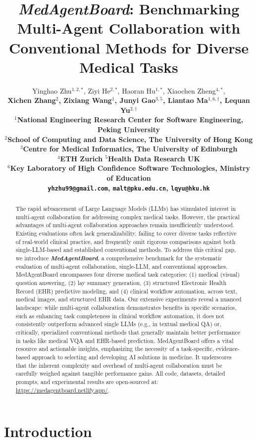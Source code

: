 \documentclass{article}
\title{\Large \textit{MedAgentBoard}: Benchmarking Multi-Agent Collaboration with Conventional Methods for Diverse Medical Tasks}
\author{
  Yinghao Zhu$^{1,2,\ast}$, Ziyi He$^{2,\ast}$, Haoran Hu$^{1,\ast}$, Xiaochen Zheng$^{4,\ast}$,\\
  \bf{Xichen Zhang$^{2}$, Zixiang Wang$^{1}$, Junyi Gao$^{3,5}$, Liantao Ma$^{1,6,\dagger}$, Lequan Yu$^{2, \dagger}$}\\
  $^{1}$National Engineering Research Center for Software Engineering, Peking University\\
  $^{2}$School of Computing and Data Science, The University of Hong Kong\\
  $^{3}$Centre for Medical Informatics, The University of Edinburgh\\
  $^{4}$ETH Zurich \quad $^{5}$Health Data Research UK\\
  $^{6}$Key Laboratory of High Confidence Software Technologies, Ministry of Education\\
  \texttt{yhzhu99@gmail.com}, \texttt{malt@pku.edu.cn}, \texttt{lqyu@hku.hk}
}
\begin{document}
\maketitle

\setcounter{footnote}{0}
\renewcommand{\thefootnote}{\fnsymbol{footnote}}

\begin{abstract}
The rapid advancement of Large Language Models (LLMs) has stimulated interest in multi-agent collaboration for addressing complex medical tasks. However, the practical advantages of multi-agent collaboration approaches remain insufficiently understood. Existing evaluations often lack generalizability, failing to cover diverse tasks reflective of real-world clinical practice, and frequently omit rigorous comparisons against both single-LLM-based and established conventional methods. To address this critical gap, we introduce \textit{\textbf{MedAgentBoard}}, a comprehensive benchmark for the systematic evaluation of multi-agent collaboration, single-LLM, and conventional approaches. MedAgentBoard encompasses four diverse medical task categories: (1) medical (visual) question answering, (2) lay summary generation, (3) structured Electronic Health Record (EHR) predictive modeling, and (4) clinical workflow automation, across text, medical images, and structured EHR data. Our extensive experiments reveal a nuanced landscape: while multi-agent collaboration demonstrates benefits in specific scenarios, such as enhancing task completeness in clinical workflow automation, it does not consistently outperform advanced single LLMs (e.g., in textual medical QA) or, critically, specialized conventional methods that generally maintain better performance in tasks like medical VQA and EHR-based prediction. MedAgentBoard offers a vital resource and actionable insights, emphasizing the necessity of a task-specific, evidence-based approach to selecting and developing AI solutions in medicine. It underscores that the inherent complexity and overhead of multi-agent collaboration must be carefully weighed against tangible performance gains. All code, datasets, detailed prompts, and experimental results are open-sourced at: \url{https://medagentboard.netlify.app/}.
\end{abstract}

\section{Introduction}
\label{sec:introduction}
\end{document}
